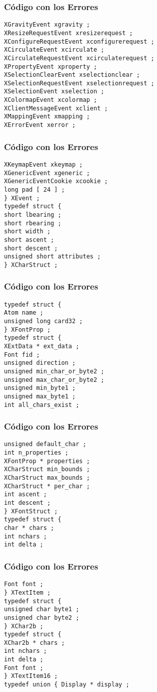 \documentclass{beamer}
\begin{document}
\begin{frame}[fragile]
\frametitle{C\'odigo con los Errores}
\begin{verbatim}
XGravityEvent xgravity ; 
XResizeRequestEvent xresizerequest ; 
XConfigureRequestEvent xconfigurerequest ; 
XCirculateEvent xcirculate ; 
XCirculateRequestEvent xcirculaterequest ; 
XPropertyEvent xproperty ; 
XSelectionClearEvent xselectionclear ; 
XSelectionRequestEvent xselectionrequest ; 
XSelectionEvent xselection ; 
XColormapEvent xcolormap ; 
XClientMessageEvent xclient ; 
XMappingEvent xmapping ; 
XErrorEvent xerror ; 
\end{verbatim}
\end{frame}
\begin{frame}[fragile]
\frametitle{C\'odigo con los Errores}
\begin{verbatim}
XKeymapEvent xkeymap ; 
XGenericEvent xgeneric ; 
XGenericEventCookie xcookie ; 
long pad [ 24 ] ; 
} XEvent ; 
typedef struct { 
short lbearing ; 
short rbearing ; 
short width ; 
short ascent ; 
short descent ; 
unsigned short attributes ; 
} XCharStruct ; 
\end{verbatim}
\end{frame}
\begin{frame}[fragile]
\frametitle{C\'odigo con los Errores}
\begin{verbatim}
typedef struct { 
Atom name ; 
unsigned long card32 ; 
} XFontProp ; 
typedef struct { 
XExtData * ext_data ; 
Font fid ; 
unsigned direction ; 
unsigned min_char_or_byte2 ; 
unsigned max_char_or_byte2 ; 
unsigned min_byte1 ; 
unsigned max_byte1 ; 
int all_chars_exist ; 
\end{verbatim}
\end{frame}
\begin{frame}[fragile]
\frametitle{C\'odigo con los Errores}
\begin{verbatim}
unsigned default_char ; 
int n_properties ; 
XFontProp * properties ; 
XCharStruct min_bounds ; 
XCharStruct max_bounds ; 
XCharStruct * per_char ; 
int ascent ; 
int descent ; 
} XFontStruct ; 
typedef struct { 
char * chars ; 
int nchars ; 
int delta ; 
\end{verbatim}
\end{frame}
\begin{frame}[fragile]
\frametitle{C\'odigo con los Errores}
\begin{verbatim}
Font font ; 
} XTextItem ; 
typedef struct { 
unsigned char byte1 ; 
unsigned char byte2 ; 
} XChar2b ; 
typedef struct { 
XChar2b * chars ; 
int nchars ; 
int delta ; 
Font font ; 
} XTextItem16 ; 
typedef union { Display * display ; 
\end{verbatim}
\end{frame}
\end{document}
